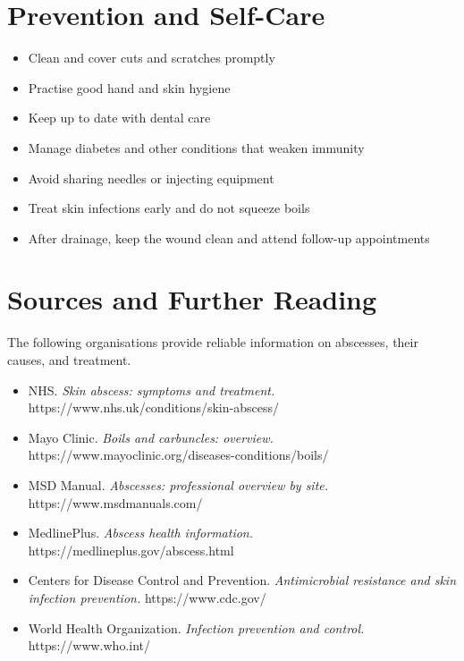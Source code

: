\section*{Prevention and Self-Care}
\begin{itemize}
    \item Clean and cover cuts and scratches promptly
    \item Practise good hand and skin hygiene
    \item Keep up to date with dental care
    \item Manage diabetes and other conditions that weaken immunity
    \item Avoid sharing needles or injecting equipment
    \item Treat skin infections early and do not squeeze boils
    \item After drainage, keep the wound clean and attend follow-up appointments
\end{itemize}

\section*{Sources and Further Reading}
The following organisations provide reliable information on abscesses, their causes, and treatment.

\begin{itemize}
    \item NHS. \textit{Skin abscess: symptoms and treatment.} https://www.nhs.uk/conditions/skin-abscess/
    \item Mayo Clinic. \textit{Boils and carbuncles: overview.} https://www.mayoclinic.org/diseases-conditions/boils/
    \item MSD Manual. \textit{Abscesses: professional overview by site.} https://www.msdmanuals.com/
    \item MedlinePlus. \textit{Abscess health information.} https://medlineplus.gov/abscess.html
    \item Centers for Disease Control and Prevention. \textit{Antimicrobial resistance and skin infection prevention.} https://www.cdc.gov/
    \item World Health Organization. \textit{Infection prevention and control.} https://www.who.int/
\end{itemize}

